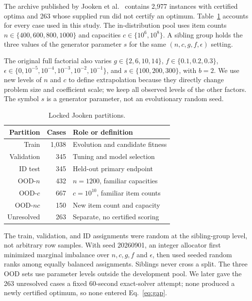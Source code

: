 \documentclass[conference]{IEEEtran}
\begin{document}
The archive published by Jooken et al.~\cite{jooken2022} contains 2,977 instances with certified optima and 263 whose supplied run did not certify an optimum. Table~\ref{table:Instances} accounts for every case used in this study. The in-distribution pool uses item counts $n \in \{400, 600, 800, 1000\}$ and capacities $c \in \{10^{6}, 10^{8}\}$. A sibling group holds the three values of the generator parameter $s$ for the same $(n, c, g, f, \epsilon)$ setting.

The original full factorial also varies $g \in \{2, 6, 10, 14\}$, $f \in \{0.1, 0.2, 0.3\}$, $\epsilon \in \{0, 10^{-5}, 10^{-4}, 10^{-3}, 10^{-2}, 10^{-1}\}$, and $s \in \{100, 200, 300\}$, with $b=2$. We use new levels of $n$ and $c$ to define extrapolation because they directly change problem size and coefficient scale; we keep all observed levels of the other factors. The symbol $s$ is a generator parameter, not an evolutionary random seed.

\begin{table}[htb!]
\caption{Locked Jooken partitions.}
\label{table:Instances}
\centering
\begin{tabular}{rrl}
\toprule
\textbf{Partition} & \textbf{Cases} & \textbf{Role or definition} \\
\midrule
Train & 1,038 & Evolution and candidate fitness \\
Validation & 345 & Tuning and model selection \\
ID test & 345 & Held-out primary endpoint \\
OOD-$n$ & 432 & $n=1200$, familiar capacities \\
OOD-$c$ & 667 & $c=10^{10}$, familiar item counts \\
OOD-$nc$ & 150 & New item count and capacity \\
Unresolved & 263 & Separate, no certified scoring \\
\bottomrule
\end{tabular}
\end{table}

The train, validation, and ID assignments were random at the sibling-group level, not arbitrary row samples. With seed 20260901, an integer allocator first minimized marginal imbalance over $n, c, g, f$ and $\epsilon$, then used seeded random ranks among equally balanced assignments. Siblings never cross a split. The three OOD sets use parameter levels outside the development pool. We later gave the 263 unresolved cases a fixed 60-second exact-solver attempt; none produced a newly certified optimum, so none entered Eq.~\eqref{eq:gap}.
\end{document}
